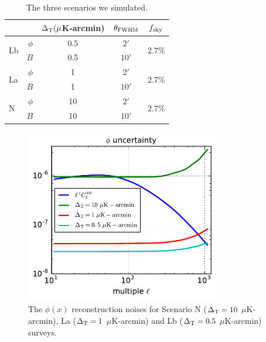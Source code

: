 \documentclass[iop,apj, numberedappendix]{emulateapj}
\begin{document}
\begin{table}
\scalebox{1.2} {
\begin{tabular}{ l r|c| c |c}
     &  & $\Delta_{\rm T} (\mu$K-arcmin) & $\theta_{\rm FWHM}$ & $f_{\rm sky}$ \\ \hline
    \multirow{2}{*}{Lb}  &  $\phi$ & 0.5  & $2'$ & \multirow{2}{*}{$2.7\%$}\\ \cline{2-4}
                         &  $B$    & 0.5 & $10'$ & \\ \hline
    \multirow{2}{*}{La}  &  $\phi$ & 1  & $2'$ & \multirow{2}{*}{$2.7\%$}\\ \cline{2-4}
                        &  $B$    & 1 & $10'$ & \\ \hline
    \multirow{2}{*}{N}  &  $\phi$ & 10  & $2'$  & \multirow{2}{*}{$2.7\%$} \\ \cline{2-4}
                        &  $B$ & 10 & $10'$ & \\ \hline
\end{tabular}
}
\caption{The three scenarios we simulated.}
\label{table}
\end{table}

\begin{figure}
\centering
\includegraphics[height=3in]{f2.pdf}
\caption{ \label{fig:phi_noise}
The $\phi(x)$ reconstruction noises for Scenario N ($\Delta_{\rm T} = 10$ $\mu$K-arcmin), La
($\Delta_{\rm T} = 1$ $\mu$K-arcmin) and Lb ($\Delta_{\rm T} = 0.5$ $\mu$K-arcmin) surveys.}
\end{figure}
\end{document}
